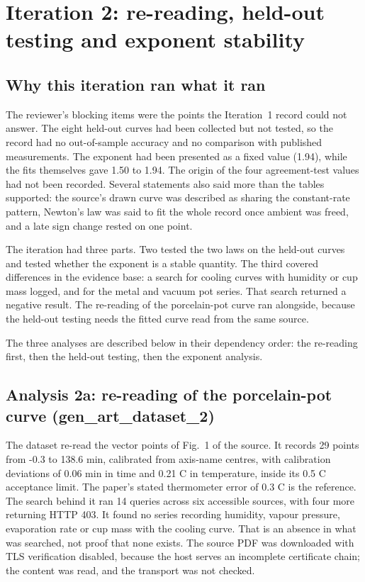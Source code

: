 \documentclass[11pt,letterpaper]{article}
\begin{document}
\section{Iteration 2: re-reading, held-out testing and exponent stability}

\subsection{Why this iteration ran what it ran}

The reviewer's blocking items were the points the Iteration~1 record could not answer. The eight held-out curves had been collected but not tested, so the record had no out-of-sample accuracy and no comparison with published measurements. The exponent had been presented as a fixed value (1.94), while the fits themselves gave 1.50 to 1.94. The origin of the four agreement-test values had not been recorded. Several statements also said more than the tables supported: the source's drawn curve was described as sharing the constant-rate pattern, Newton's law was said to fit the whole record once ambient was freed, and a late sign change rested on one point.

The iteration had three parts. Two tested the two laws on the held-out curves and tested whether the exponent is a stable quantity. The third covered differences in the evidence base: a search for cooling curves with humidity or cup mass logged, and for the metal and vacuum pot series. That search returned a negative result. The re-reading of the porcelain-pot curve ran alongside, because the held-out testing needs the fitted curve read from the same source.

The three analyses are described below in their dependency order: the re-reading first, then the held-out testing, then the exponent analysis.

\subsection{Analysis 2a: re-reading of the porcelain-pot curve (gen\_art\_dataset\_2)}

The dataset re-read the vector points of Fig.~1 of the source. It records 29 points from -0.3 to 138.6 min, calibrated from axis-name centres, with calibration deviations of 0.06 min in time and 0.21 C in temperature, inside its 0.5 C acceptance limit. The paper's stated thermometer error of 0.3 C is the reference. The search behind it ran 14 queries across six accessible sources, with four more returning HTTP 403. It found no series recording humidity, vapour pressure, evaporation rate or cup mass with the cooling curve. That is an absence in what was searched, not proof that none exists. The source PDF was downloaded with TLS verification disabled, because the host serves an incomplete certificate chain; the content was read, and the transport was not checked.
\end{document}
